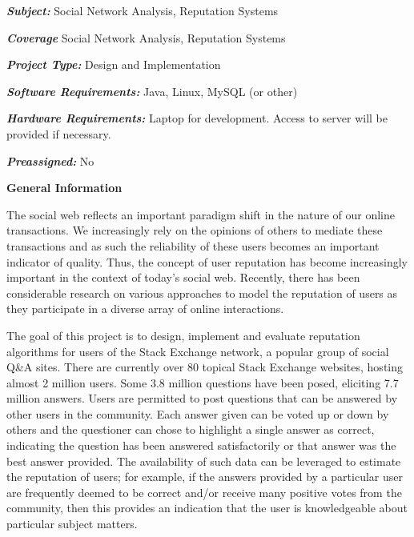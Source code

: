 \documentclass[]{final_report}
\begin{document}
\maketitle
\tableofcontents{}\newpage

\begin{specification}

\textbf{\textsl{Subject:}} Social Network Analysis, Reputation Systems

\textbf{\textsl{Coverage}} Social Network Analysis, Reputation Systems

\textbf{\textsl{Project Type:}} Design and Implementation

\textbf{\textsl{Software Requirements:}} Java, Linux, MySQL (or other)

\textbf{\textsl{Hardware Requirements:}} Laptop for development. Access to server will be provided if necessary.

\textbf{\textsl{Preassigned:}} No


\textbf{General Information}

The social web reflects an important paradigm shift in the nature of our online transactions. We increasingly rely on the opinions of others to mediate these transactions and as such the reliability of these users becomes an important indicator of quality. Thus, the concept of user reputation has become increasingly important in the context of today's social web. Recently, there has been considerable research on various approaches to model the reputation of users as they participate in a diverse array of online interactions.

The goal of this project is to design, implement and evaluate reputation algorithms for users of the Stack Exchange network, a popular group of social Q\&A sites. There are currently over 80 topical Stack Exchange websites, hosting almost 2 million users. Some 3.8 million questions have been posed, eliciting 7.7 million answers. Users are permitted to post questions that can be answered by other users in the community. Each answer given can be voted up or down by others and the questioner can chose to highlight a single answer as correct, indicating the question has been answered satisfactorily or that answer was the best answer provided. The availability of such data can be leveraged to estimate the reputation of users; for example, if the answers provided by a particular user are frequently deemed to be correct and/or receive many positive votes from the community, then this provides an indication that the user is knowledgeable about particular subject matters.


\end{specification}
\end{document}
